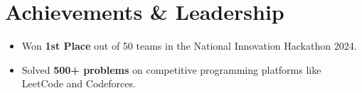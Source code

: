 \documentclass[a4paper,11pt]{article}
\newcommand{\resumeItem}[1]{
  \item\small{{#1 \vspace{-2pt}}}
}
\newcommand{\resumeItemListStart}{\begin{itemize}}
\newcommand{\resumeItemListEnd}{\end{itemize}\vspace{-5pt}}
\begin{document}
\section{Achievements \& Leadership}
 \resumeItemListStart
    \resumeItem{Won \textbf{1st Place} out of 50 teams in the National Innovation Hackathon 2024.}
    \resumeItem{Solved \textbf{500+ problems} on competitive programming platforms like LeetCode and Codeforces.}
 \resumeItemListEnd

\end{document}
